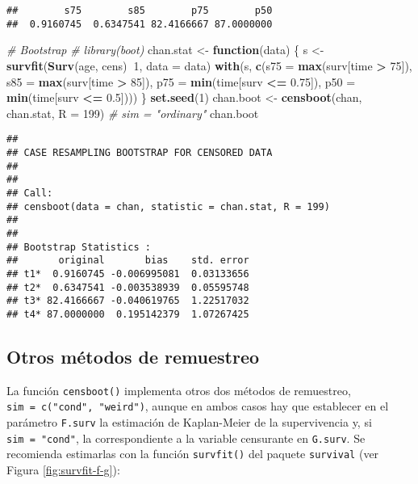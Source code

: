 \documentclass[]{book}
\newenvironment{Shaded}{\begin{snugshade}}{\end{snugshade}}
\newcommand{\KeywordTok}[1]{\textcolor[rgb]{0.13,0.29,0.53}{\textbf{#1}}}
\newcommand{\DataTypeTok}[1]{\textcolor[rgb]{0.13,0.29,0.53}{#1}}
\newcommand{\DecValTok}[1]{\textcolor[rgb]{0.00,0.00,0.81}{#1}}
\newcommand{\FloatTok}[1]{\textcolor[rgb]{0.00,0.00,0.81}{#1}}
\newcommand{\StringTok}[1]{\textcolor[rgb]{0.31,0.60,0.02}{#1}}
\newcommand{\CommentTok}[1]{\textcolor[rgb]{0.56,0.35,0.01}{\textit{#1}}}
\newcommand{\ControlFlowTok}[1]{\textcolor[rgb]{0.13,0.29,0.53}{\textbf{#1}}}
\newcommand{\OperatorTok}[1]{\textcolor[rgb]{0.81,0.36,0.00}{\textbf{#1}}}
\newcommand{\NormalTok}[1]{#1}
\theoremstyle{break}
\theoremstyle{definition}
\theoremstyle{definition}
\theoremstyle{definition}
\theoremstyle{remark}
\begin{document}
\begin{verbatim}
##        s75        s85        p75        p50 
##  0.9160745  0.6347541 82.4166667 87.0000000
\end{verbatim}

\begin{Shaded}
\begin{Highlighting}[]
\CommentTok{# Bootstrap}
\CommentTok{# library(boot)}
\NormalTok{chan.stat <-}\StringTok{ }\ControlFlowTok{function}\NormalTok{(data) \{}
\NormalTok{    s <-}\StringTok{ }\KeywordTok{survfit}\NormalTok{(}\KeywordTok{Surv}\NormalTok{(age, cens)}\OperatorTok{~}\DecValTok{1}\NormalTok{, }\DataTypeTok{data =}\NormalTok{ data)}
    \KeywordTok{with}\NormalTok{(s, }\KeywordTok{c}\NormalTok{(}\DataTypeTok{s75 =} \KeywordTok{max}\NormalTok{(surv[time }\OperatorTok{>}\StringTok{ }\DecValTok{75}\NormalTok{]), }\DataTypeTok{s85 =} \KeywordTok{max}\NormalTok{(surv[time }\OperatorTok{>}\StringTok{ }\DecValTok{85}\NormalTok{]),}
            \DataTypeTok{p75 =} \KeywordTok{min}\NormalTok{(time[surv }\OperatorTok{<=}\StringTok{ }\FloatTok{0.75}\NormalTok{]), }\DataTypeTok{p50 =} \KeywordTok{min}\NormalTok{(time[surv }\OperatorTok{<=}\StringTok{ }\FloatTok{0.5}\NormalTok{])))}
\NormalTok{\}}
\KeywordTok{set.seed}\NormalTok{(}\DecValTok{1}\NormalTok{)}
\NormalTok{chan.boot <-}\StringTok{ }\KeywordTok{censboot}\NormalTok{(chan, chan.stat, }\DataTypeTok{R =} \DecValTok{199}\NormalTok{) }\CommentTok{# sim = "ordinary"}
\NormalTok{chan.boot}
\end{Highlighting}
\end{Shaded}

\begin{verbatim}
## 
## CASE RESAMPLING BOOTSTRAP FOR CENSORED DATA
## 
## 
## Call:
## censboot(data = chan, statistic = chan.stat, R = 199)
## 
## 
## Bootstrap Statistics :
##       original       bias    std. error
## t1*  0.9160745 -0.006995081  0.03133656
## t2*  0.6347541 -0.003538939  0.05595748
## t3* 82.4166667 -0.040619765  1.22517032
## t4* 87.0000000  0.195142379  1.07267425
\end{verbatim}

\subsection{Otros métodos de
remuestreo}\label{otros-muxe9todos-de-remuestreo}

La función \texttt{censboot()} implementa otros dos métodos de
remuestreo, \texttt{sim\ =\ c("cond",\ "weird")}, aunque en ambos casos
hay que establecer en el parámetro \texttt{F.surv} la estimación de
Kaplan-Meier de la supervivencia y, si \texttt{sim\ =\ "cond"}, la
correspondiente a la variable censurante en \texttt{G.surv}. Se
recomienda estimarlas con la función \texttt{survfit()} del paquete
\texttt{survival} (ver Figura \ref{fig:survfit-f-g}):
\end{document}
